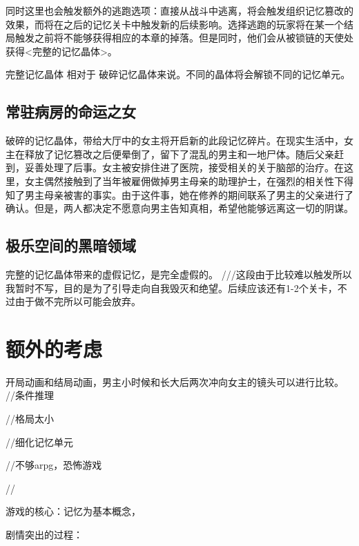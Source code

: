 \documentclass[12pt, a4paper]{article}
\begin{document}
            同时这里也会触发额外的逃跑选项：直接从战斗中逃离，将会触发组织记忆篡改的效果，而将在之后的记忆关卡中触发新的后续影响。选择逃跑的玩家将在某一个结局触发之前将不能够获得相应的本章的掉落。但是同时，他们会从被锁链的天使处获得<完整的记忆晶体>。

            完整记忆晶体 相对于 破碎记忆晶体来说。不同的晶体将会解锁不同的记忆单元。

    \subsection*{常驻病房的命运之女}
            
            破碎的记忆晶体，带给大厅中的女主将开启新的此段记忆碎片。在现实生活中，女主在释放了记忆篡改之后便晕倒了，留下了混乱的男主和一地尸体。随后父亲赶到，妥善处理了后事。女主被安排住进了医院，接受相关的关于脑部的治疗。在这里，女主偶然接触到了当年被雇佣做掉男主母亲的助理护士，在强烈的相关性下得知了男主母亲被害的事实。由于这件事，她在修养的期间联系了男主的父亲进行了确认。但是，两人都决定不愿意向男主告知真相，希望他能够远离这一切的阴谋。

    \subsection*{} 


    \subsection*{极乐空间的黑暗领域}
            
            完整的记忆晶体带来的虚假记忆，是完全虚假的。
            ///这段由于比较难以触发所以我暂时不写，目的是为了引导走向自我毁灭和绝望。后续应该还有1-2个关卡，不过由于做不完所以可能会放弃。
            
    \newpage 

        \section*{额外的考虑}
            开局动画和结局动画，男主小时候和长大后两次冲向女主的镜头可以进行比较。
        //条件推理

        //格局太小  

        //细化记忆单元

        //不够arpg，恐怖游戏

        //


        游戏的核心：记忆为基本概念，

        剧情突出的过程：
\end{document}
